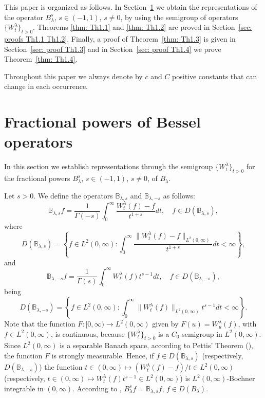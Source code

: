 \documentclass[a4paper,10pt, reqno]{amsart}
\theoremstyle{definition}
\theoremstyle{remark}
\numberwithin{equation}{section}
\begin{document}
This paper is organized as follows. In Section~\ref{sec: fract powers} we obtain the representations of the operator $B_\lambda^s$, $s\in (-1,1)$, $s\neq 0$, by using the semigroup of operators $\{W_t^\lambda \}_{t>0}$. Theorems \ref{thm: Th1.1} and \ref{thm: Th1.2} are proved in Section~\ref{sec: proofs Th1.1 Th1.2}. Finally, a proof of Theorem~\ref{thm: Th1.3} is given in Section~\ref{sec: proof Th1.3} and in Section~\ref{sec: proof Th1.4} we prove Theorem~\ref{thm: Th1.4}.

Throughout this paper we always denote by $c$ and $C$ positive constants that can change in each occurrence.


\section{Fractional powers of Bessel operators}\label{sec: fract powers}

In this section we establish representations through the semigroup $\{W_t^\lambda \}_{t>0}$ for the fractional powers $B_\lambda^s$, $s\in (-1,1)$, $s\neq 0$, of $B_\lambda$.


Let $s>0$. We define the operators $\mathbb B_{\lambda ,s}$ and $\mathbb B_{\lambda ,-s}$ as follows:
\[
\mathbb B_{\lambda, s}f=\frac{1}{\Gamma (-s)}\int_0^\infty \frac{W_t^\lambda (f)-f}{t^{1+s}}dt,\quad f\in D(\mathbb B_{\lambda, s}),
\]
where
\[
D(\mathbb B_{\lambda, s})=\left\{f\in L^2(0,\infty): \int_0^\infty \frac{\|W_t^\lambda (f)-f\|_{L^2(0,\infty)}}{t^{1+s}}dt<\infty\right\},
\]
and 
\[
\mathbb B_{\lambda, -s}f=\frac{1}{\Gamma (s)}\int_0^\infty W_t^\lambda (f)t^{s-1}dt,\quad f\in D(\mathbb B_{\lambda, -s}),
\]
being
\[
D(\mathbb B_{\lambda, -s})=\left\{f\in L^2(0,\infty): \int_0^\infty \|W_t^\lambda (f)\|_{L^2(0,\infty)}t^{s-1}dt<\infty\right\}.
\]
Note that the function $F:[0,\infty)\to L^2(0,\infty)$ given by $F(u)=W_u^\lambda (f)$, with $f\in L^2(0,\infty)$, is continuous, because $\{W_t^\lambda \}_{t>0}$ is a $C_0$-semigroup in $L^2(0,\infty)$. Since $L^2(0,\infty)$ is a separable Banach space, according to Pettis' Theorem (\cite[p. 131]{Yo}), the function $F$ is strongly measurable. Hence, if $f\in D(\mathbb B_{\lambda ,s})$ (respectively, $D(\mathbb B_{\lambda ,-s})$) the function $t\in (0,\infty)\mapsto (W_t^\lambda (f)-f)/t\in L^2(0,\infty)$ (respectively, $t\in (0,\infty)\mapsto W_t^\lambda (f)t^{s-1}\in L^2(0,\infty)$) is $L^2(0,\infty)$-Bochner integrable in $(0,\infty)$. According to \cite[(3), p. 260]{Yo}, $B_\lambda^sf=\mathbb B_{\lambda ,s}f$, $f\in D(B_\lambda)$. 
\end{document}
